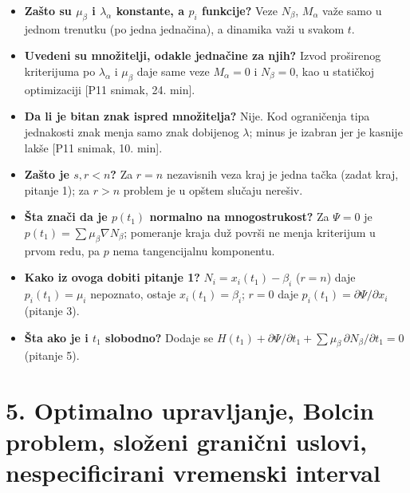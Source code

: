 \documentclass[11pt,a4paper,parskip=half,headsepline,numbers=noenddot]{scrartcl}
\DeclareRobustCommand{\izvor}[1]{{\small\color{izvorC}[#1]}}
\begin{document}
\begin{itemize}
\item \textbf{Zašto su \(\mu_\beta\) i \(\lambda_\alpha\) konstante, a \(p_i\) funkcije?} Veze \(N_\beta\), \(M_\alpha\) važe samo u jednom trenutku (po jedna jednačina), a dinamika važi u svakom \(t\).
\item \textbf{Uvedeni su množitelji, odakle jednačine za njih?} Izvod proširenog kriterijuma po \(\lambda_\alpha\) i \(\mu_\beta\) daje same veze \(M_\alpha = 0\) i \(N_\beta = 0\), kao u statičkoj optimizaciji \izvor{P11 snimak, 24. min}.
\item \textbf{Da li je bitan znak ispred množitelja?} Nije. Kod ograničenja tipa jednakosti znak menja samo znak dobijenog \(\lambda\); minus je izabran jer je kasnije lakše \izvor{P11 snimak, 10. min}.
\item \textbf{Zašto je \(s, r < n\)?} Za \(r = n\) nezavisnih veza kraj je jedna tačka (zadat kraj, pitanje 1); za \(r > n\) problem je u opštem slučaju nerešiv.
\item \textbf{Šta znači da je \(p(t_1)\) normalno na mnogostrukost?} Za \(\Psi = 0\) je \(p(t_1) = \sum\mu_\beta\nabla N_\beta\); pomeranje kraja duž površi ne menja kriterijum u prvom redu, pa \(p\) nema tangencijalnu komponentu.
\item \textbf{Kako iz ovoga dobiti pitanje 1?} \(N_i = x_i(t_1) - \beta_i\) (\(r = n\)) daje \(p_i(t_1) = \mu_i\) nepoznato, ostaje \(x_i(t_1) = \beta_i\); \(r = 0\) daje \(p_i(t_1) = \partial\Psi/\partial x_i\) (pitanje 3).
\item \textbf{Šta ako je i \(t_1\) slobodno?} Dodaje se \(H(t_1) + \partial\Psi/\partial t_1 + \sum\mu_\beta\,\partial N_\beta/\partial t_1 = 0\) (pitanje 5).
\end{itemize}

\section{5. Optimalno upravljanje, Bolcin problem, složeni granični uslovi, nespecificirani vremenski interval}
\end{document}
